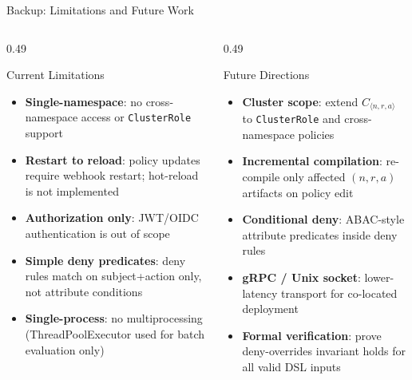 \documentclass[aspectratio=169,10pt]{beamer}
\newcommand{\tightitems}{%
  \setlength{\topsep}{1pt}%
  \setlength{\itemsep}{2pt}%
  \setlength{\parsep}{0pt}%
  \setlength{\parskip}{0pt}%
}
\begin{document}
\begin{frame}[t,noframenumbering]{Backup: Limitations and Future Work}
\vspace{3pt}
\begin{columns}[T,onlytextwidth]
\begin{column}{0.49\textwidth}
\begin{callout}{Current Limitations}
\begin{itemize}\tightitems
\item \textbf{Single-namespace}: no cross-namespace access or \texttt{ClusterRole} support
\item \textbf{Restart to reload}: policy updates require webhook restart; hot-reload is not implemented
\item \textbf{Authorization only}: JWT/OIDC authentication is out of scope
\item \textbf{Simple deny predicates}: deny rules match on subject+action only, not attribute conditions
\item \textbf{Single-process}: no multiprocessing (ThreadPoolExecutor used for batch evaluation only)
\end{itemize}
\end{callout}
\end{column}
\begin{column}{0.49\textwidth}
\begin{callout}{Future Directions}
\begin{itemize}\tightitems
\item \textbf{Cluster scope}: extend $C_{\langle n,r,a\rangle}$ to \texttt{ClusterRole} and cross-namespace policies
\item \textbf{Incremental compilation}: re-compile only affected $(n,r,a)$ artifacts on policy edit
\item \textbf{Conditional deny}: ABAC-style attribute predicates inside deny rules
\item \textbf{gRPC / Unix socket}: lower-latency transport for co-located deployment
\item \textbf{Formal verification}: prove deny-overrides invariant holds for all valid DSL inputs
\end{itemize}
\end{callout}
\end{column}
\end{columns}
\end{frame}
\end{document}
